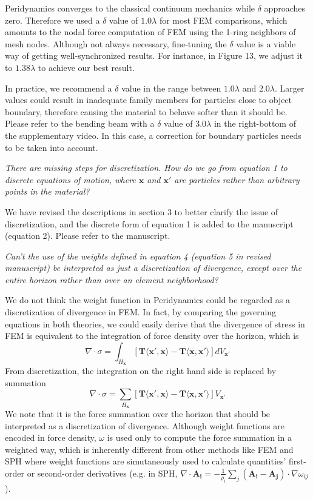Peridynamics converges to the classical continuum mechanics while $\delta$ approaches zero\cite{Weckner2005705}. Therefore we used a $\delta$ value of $1.0\lambda$ for most FEM comparisons, which amounts to the nodal force computation of FEM using the 1-ring neighbors of mesh nodes. Although not always necessary, fine-tuning the $\delta$ value is a viable way of getting well-synchronized results. For instance, in Figure 13, we adjust it to $1.38\lambda$ to achieve our best result.

In practice, we recommend a $\delta$ value in the range between $1.0\lambda$ and $2.0\lambda$.
Larger values could result in inadequate family members for particles close to object boundary, therefore causing the material to behave softer than it should be. Please refer to the bending beam with a $\delta$ value of $3.0\lambda$ in the right-bottom of the supplementary video. In this case, a correction for boundary particles needs to be taken into account.

\emph{There are missing steps for discretization. How do we go from equation 1 to discrete equations of motion, where $\mathbf{x}$ and $\mathbf{x'}$ are particles rather than arbitrary points in the material? }

We have revised the descriptions in section 3 to better clarify the issue of discretization, and the discrete form of equation 1 is added to the manuscript (equation 2). Please refer to the manuscript.

\emph{Can't the use of the weights defined in equation 4 (equation 5 in revised manuscript) be interpreted as just a discretization of divergence, except over the entire horizon rather than over an element neighborhood?}

We do not think the weight function in Peridynamics could be regarded as a discretization of divergence in FEM.
In fact, by comparing the governing equations in both theories, we could easily derive that
the divergence of stress in FEM is equivalent to the integration of force density over the horizon, which is
\begin{equation*}
\nabla\cdot\sigma = \int_{H_\mathbf{x}}[\mathbf{T}\langle\mathbf{x}',\mathbf{x}\rangle - \mathbf{T}\langle\mathbf{x},\mathbf{x}'\rangle]dV_{\mathbf{x}'}
\end{equation*}
From discretization, the integration on the right hand side is replaced by summation
\begin{equation*}
\nabla\cdot\sigma = \sum_{H_\mathbf{x}}[\mathbf{T}\langle\mathbf{x}',\mathbf{x}\rangle - \mathbf{T}\langle\mathbf{x},\mathbf{x}'\rangle]V_{\mathbf{x}'}
\end{equation*}
We note that it is the force summation over the horizon that should be interpreted as a discretization of divergence.
Although weight functions are encoded in force density, $\omega$ is used only to compute the force summation in a weighted way, which is inherently different from other methods like FEM and SPH where weight functions are simutaneously used to calculate quantities' first-order or second-order derivatives
(e.g. in SPH, $\nabla\cdot\mathbf{A_i} = -\frac{1}{\rho_i}\sum_j(\mathbf{A_i - A_j})\cdot\nabla\omega_{ij}$).

